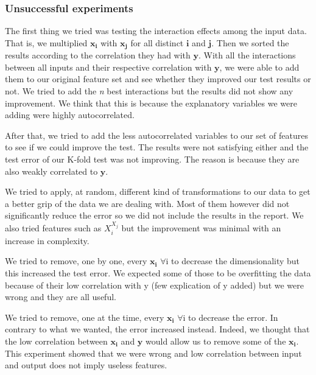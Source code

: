 \documentclass{article} %
\begin{document}
\subsubsection{Unsuccessful experiments}

The first thing we tried was testing the interaction effects among the input data. That is, we multiplied $\mathbf{x_{i}}$ with $\mathbf{x_{j}}$ for all distinct $\mathbf{i}$ and $\mathbf{j}$. Then we sorted the results according to the correlation they had with $\mathbf{y}$. With all the interactions between all inputs and their respective correlation with $\mathbf{y}$, we were able to add them to our original feature set and see whether they improved our test results or not. We tried to add the \textit{n} best interactions but the results did not show any improvement. We think that this is because the explanatory variables we were adding were highly autocorrelated.

After that, we tried to add the less autocorrelated variables to our set of features to see if we could improve the test. The results were not satisfying either and the test error of our K-fold test was not improving. The reason is because they are also weakly correlated to $\mathbf{y}$. 


We tried to apply, at random, different kind of transformations to our data to get a better grip of the data we are dealing with. Most of them however did not significantly reduce the error so we did not include the results in the report. We also tried features such as $X_{i}^{X_{j}}$ but the improvement was minimal with an increase in complexity.


We tried to remove, one by one, every $\mathbf{x_{i}}$ $\forall$i to decrease the dimensionality but this increased the test error. We expected some of those to be overfitting the data because of their low correlation with y (few explication of y added) but we were wrong and they are all useful.


We tried to remove, one at the time, every $\mathbf{x_{i}}$ $\forall$i to decrease the error. In contrary to what we wanted, the error increased instead. Indeed, we thought that the low correlation between $\mathbf{x_{i}}$ and $\mathbf{y}$ would allow us to remove some of the $\mathbf{x_{i}}$. This experiment showed that we were wrong and low correlation between input and output does not imply useless features. 
\end{document}
